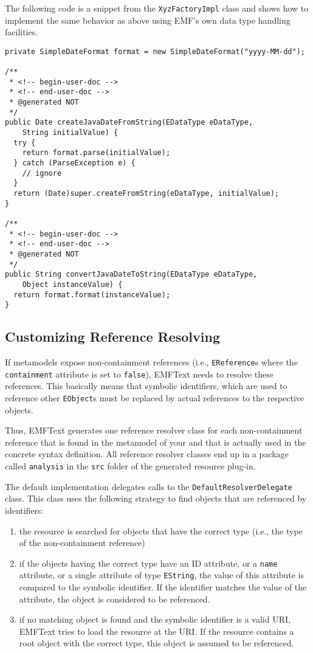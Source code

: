 The following code is a snippet from the \texttt{XyzFactoryImpl} class and shows
how to implement the same behavior as above using EMF's own data type handling
facilities.

\lstset{language=Java}
\begin{lstlisting}
private SimpleDateFormat format = new SimpleDateFormat("yyyy-MM-dd");

/**
 * <!-- begin-user-doc -->
 * <!-- end-user-doc -->
 * @generated NOT
 */
public Date createJavaDateFromString(EDataType eDataType, 
    String initialValue) {
  try {
    return format.parse(initialValue);
  } catch (ParseException e) {
    // ignore
  }
  return (Date)super.createFromString(eDataType, initialValue);
}

/**
 * <!-- begin-user-doc -->
 * <!-- end-user-doc -->
 * @generated NOT
 */
public String convertJavaDateToString(EDataType eDataType, 
    Object instanceValue) {
  return format.format(instanceValue);
}
\end{lstlisting}

\subsection{Customizing Reference Resolving}
\label{sec:cust_reference_resolving}

If metamodels expose non-containment references (i.e., \texttt{EReference}s
where the \texttt{containment} attribute is set to \texttt{false}), EMFText
needs to resolve these references. This basically means that symbolic
identifiers, which are used to reference other \texttt{EObject}s must be
replaced by actual references to the respective objects.

Thus, EMFText generates one reference resolver class for each non-containment
reference that is found in the metamodel of your \DSL and that is actually used
in the concrete syntax definition. All reference resolver classes end up in a
package called \texttt{analysis} in the \texttt{src} folder of the generated 
resource plug-in.

The default implementation delegates calls to the
\texttt{DefaultResolverDelegate} class. This class uses the following strategy
to find objects that are referenced by identifiers:

\begin{enumerate}
  \item the resource is searched for objects that have the correct type (i.e.,
  the type of the non-containment reference)
  \item if the objects having the correct type have an ID attribute, or a
  \texttt{name} attribute, or a single attribute of type \texttt{EString}, the
  value of this attribute is compared to the symbolic identifier. If the
  identifier matches the value of the attribute, the object is considered to be
  referenced.
  \item if no matching object is found and the symbolic identifier is a valid
  URI, EMFText tries to load the resource at the URI. If the resource
  contains a root object with the correct type, this object is assumed to be
  referenced.
\end{enumerate}

